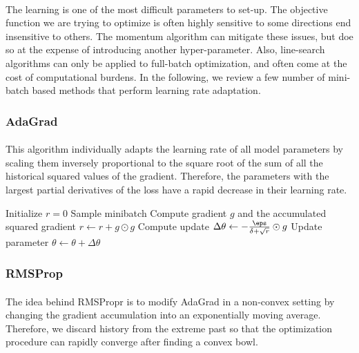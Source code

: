 \documentclass[a4paper]{article}
\begin{document}
{{			\paragraph{} The learning is one of the most difficult parameters to set-up. The objective function we are trying to optimize is often highly sensitive to some directions end insensitive to others. The momentum algorithm can mitigate these issues, but doe so at the expense of introducing another hyper-parameter. Also, line-search algorithms can only be applied to full-batch optimization, and often come at the cost of computational burdens. In the following, we review a few number of mini-batch based methods that perform learning rate adaptation. 
			
			\subsubsection{AdaGrad}
			{
				\paragraph{} This algorithm individually adapts the learning rate of all model parameters by scaling them inversely proportional to the square root of the sum of all the historical squared values of the gradient. Therefore, the parameters with the largest partial derivatives of the loss have a rapid decrease in their learning rate. 
				\vspace{5pt}
				
				{
					Initialize $r=0$\;
					{
						Sample minibatch\; 
						Compute gradient $g$ and the accumulated squared gradient $r\leftarrow r + g\odot g$\;
						Compute update $\Delta\theta \leftarrow -\frac{\eps}{\delta + \sqrt{r}}\odot g$\;
						Update parameter $\theta \leftarrow \theta + \Delta \theta$\;
					}
				}
				
			}
			\subsubsection{RMSProp}
			{	
				\paragraph{} The idea behind RMSPropr is to modify AdaGrad in a non-convex setting by changing the gradient accumulation into an exponentially moving average. Therefore, we discard history from the extreme past so that the optimization procedure can rapidly converge after finding a convex bowl. 
				\vspace{7pt}
				
}}}
\end{document}
